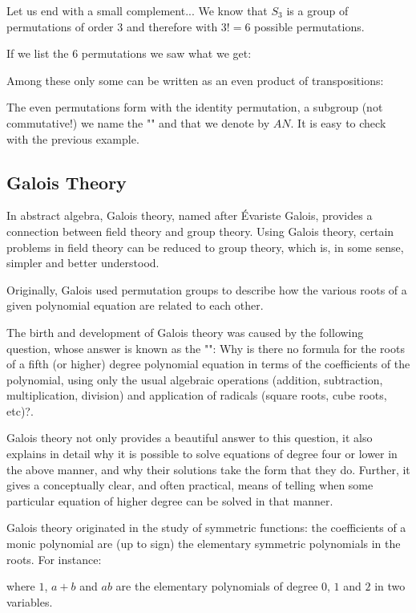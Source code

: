 	Let us end with a small complement... We know that $S_3$ is a group of permutations of order $3$ and therefore with $3!=6$ possible permutations.
	
	If we list the $6$ permutations we saw what we get:
	
	Among these only some can be written as an even product of transpositions:
	
	The even permutations form with the identity permutation, a subgroup (not commutative!) we name the "" and that we denote by $AN$. It is easy to check with the previous example.
		
	\subsection{Galois Theory}\label{galois theory}
	In abstract algebra, Galois theory, named after Évariste Galois, provides a connection between field theory and group theory. Using Galois theory, certain problems in field theory can be reduced to group theory, which is, in some sense, simpler and better understood.
	
	Originally, Galois used permutation groups to describe how the various roots of a given polynomial equation are related to each other. 
	
	The birth and development of Galois theory was caused by the following question, whose answer is known as the "": Why is there no formula for the roots of a fifth (or higher) degree polynomial equation in terms of the coefficients of the polynomial, using only the usual algebraic operations (addition, subtraction, multiplication, division) and application of radicals (square roots, cube roots, etc)?.
	
	Galois theory not only provides a beautiful answer to this question, it also explains in detail why it is possible to solve equations of degree four or lower in the above manner, and why their solutions take the form that they do. Further, it gives a conceptually clear, and often practical, means of telling when some particular equation of higher degree can be solved in that manner.
	
	Galois theory originated in the study of symmetric functions:  the coefficients of a monic polynomial are (up to sign) the elementary symmetric polynomials in the roots. For instance:
	
 	where $1$, $a + b$ and $ab$ are the elementary polynomials of degree $0$, $1$ and $2$ in two variables.
 	
